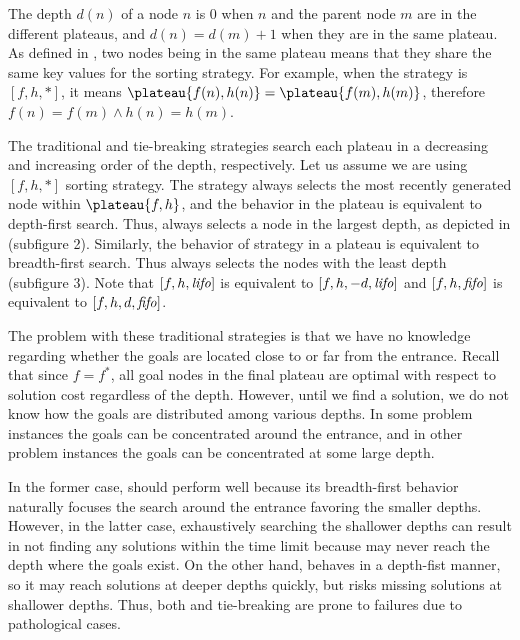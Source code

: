 The depth $d(n)$ of a node $n$ is 0 when $n$ and
the parent node $m$ are in the different plateaus,
and $d(n)=d(m)+1$ when they are in the same plateau.
As defined in , two nodes being in the same plateau
means that they share the same key values for the sorting strategy.
For example, when the strategy is $[f,h,*]$,
it means $\plateau{f(n),h(n)}=\plateau{f(m),h(m)}$, therefore
$f(n) = f(m) \land h(n) = h(m)$.

The traditional \lifo and \fifo tie-breaking strategies
search each plateau in a decreasing and increasing order of the depth, respectively.
Let us assume we are using $[f,h,*]$ sorting strategy.
The \lifo strategy always selects the most recently generated node
within $\plateau{f,h}$, and the behavior in the plateau is equivalent to depth-first search.
Thus, \lifo always selects a node in the largest depth,
as depicted in  (subfigure 2).
Similarly, the behavior of \fifo strategy 
in a plateau is equivalent to breadth-first search. Thus \fifo 
always selects the nodes with the least depth (subfigure 3).
Note that  $[f,h,{\text{\textit{lifo}}}]$ is equivalent to $[f,h,-d,{\text{\textit{lifo}}}]$ and
$[f,h,{\text{\textit{fifo}}}]$ is equivalent to $[f,h,d,{\text{\textit{fifo}}}]$.

The problem with these traditional strategies is that we have no knowledge
regarding whether the goals are located close to or far from the entrance. Recall
that since $f=f^*$, all goal nodes in the final plateau are optimal with respect to solution cost
regardless of the depth.
However, until we find a
solution, we do not know how the goals are distributed among various
depths. In some problem instances the goals can be concentrated around
the entrance, and in other problem instances the goals can be
concentrated at some large depth. %

In the former case, \fifo
should perform well because its breadth-first behavior naturally
focuses the search around the entrance favoring the smaller depths.
However, in the latter case, exhaustively searching
the shallower depths can result in not finding any solutions within
the time limit because \fifo may never reach the depth where the goals
exist.  On the other hand, \lifo behaves in a depth-fist manner, so it
may reach solutions at deeper depths quickly, but risks missing
solutions at shallower depths.  Thus, both \fifo and \lifo tie-breaking
are prone to failures due to pathological cases.

